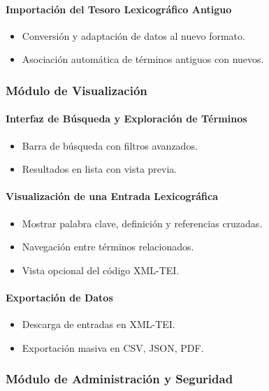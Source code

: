 \documentclass{article}
\begin{document}
\paragraph{Importación del Tesoro Lexicográfico Antiguo}
\begin{itemize}
    \item Conversión y adaptación de datos al nuevo formato.
    \item Asociación automática de términos antiguos con nuevos.
\end{itemize}

\subsubsection{Módulo de Visualización}

\paragraph{Interfaz de Búsqueda y Exploración de Términos}
\begin{itemize}
    \item Barra de búsqueda con filtros avanzados.
    \item Resultados en lista con vista previa.
\end{itemize}

\paragraph{Visualización de una Entrada Lexicográfica}
\begin{itemize}
    \item Mostrar palabra clave, definición y referencias cruzadas.
    \item Navegación entre términos relacionados.
    \item Vista opcional del código XML-TEI.
\end{itemize}

\paragraph{Exportación de Datos}
\begin{itemize}
    \item Descarga de entradas en XML-TEI.
    \item Exportación masiva en CSV, JSON, PDF.
\end{itemize}

\subsubsection{Módulo de Administración y Seguridad}
\end{document}
